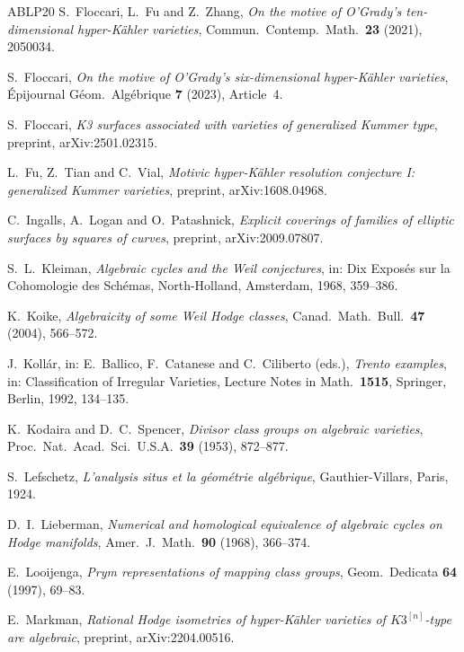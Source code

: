 \documentclass[11pt]{amsart}
\theoremstyle{definition}
\theoremstyle{remark}
\begin{document}
\begin{thebibliography}{ABLP20}
S.~Floccari, L.~Fu and Z.~Zhang, \emph{On the motive of O'Grady's
ten-dimensional hyper-K\"ahler varieties}, Commun.\ Contemp.\ Math.\
\textbf{23} (2021), 2050034.

S.~Floccari, \emph{On the motive of O'Grady's six-dimensional hyper-K\"ahler
varieties}, \'Epijournal G\'eom.\ Alg\'ebrique \textbf{7} (2023), Article~4.

S.~Floccari, \emph{K3 surfaces associated with varieties of generalized
Kummer type}, preprint, arXiv:2501.02315.

L.~Fu, Z.~Tian and C.~Vial, \emph{Motivic hyper-K\"ahler resolution
conjecture I: generalized Kummer varieties}, preprint, arXiv:1608.04968.

C.~Ingalls, A.~Logan and O.~Patashnick, \emph{Explicit coverings of families
of elliptic surfaces by squares of curves}, preprint, arXiv:2009.07807.

S.~L.~Kleiman, \emph{Algebraic cycles and the Weil conjectures}, in: Dix
Expos\'es sur la Cohomologie des Sch\'emas, North-Holland, Amsterdam, 1968,
359--386.

K.~Koike, \emph{Algebraicity of some Weil Hodge classes}, Canad.\ Math.\
Bull.\ \textbf{47} (2004), 566--572.

J.~Koll\'ar, in: E.~Ballico, F.~Catanese and C.~Ciliberto (eds.),
\emph{Trento examples}, in: Classification of Irregular Varieties, Lecture
Notes in Math.\ \textbf{1515}, Springer, Berlin, 1992, 134--135.

\bibitem[KS53]{KS53}
K.~Kodaira and D.~C.~Spencer, \emph{Divisor class groups on algebraic
varieties}, Proc.\ Nat.\ Acad.\ Sci.\ U.S.A.\ \textbf{39} (1953), 872--877.

\bibitem[Lef24]{Lef24}
S.~Lefschetz, \emph{L'analysis situs et la g\'eom\'etrie alg\'ebrique},
Gauthier-Villars, Paris, 1924.

D.~I.~Lieberman, \emph{Numerical and homological equivalence of algebraic
cycles on Hodge manifolds}, Amer.\ J.\ Math.\ \textbf{90} (1968), 366--374.

\bibitem[Loo97]{Loo97}
E.~Looijenga, \emph{Prym representations of mapping class groups}, Geom.\
Dedicata \textbf{64} (1997), 69--83.

\bibitem[Mar22]{Mar22}
E.~Markman, \emph{Rational Hodge isometries of hyper-K\"ahler varieties of
$K3^{[n]}$-type are algebraic}, preprint, arXiv:2204.00516.


\end{thebibliography}
\end{document}
